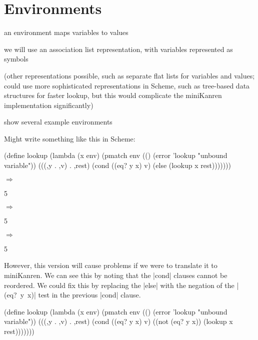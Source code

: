 \chapter{Environments}

an environment maps variables to values

we will use an association list representation, with variables represented as symbols

(other representations possible, such as separate flat lists for
variables and values; could use more sophisticated representations in
Scheme, such as tree-based data structures for faster lookup, but this
would complicate the miniKanren implementation significantly)

show several example environments

Might write something like this in Scheme:

\begin{schemedisplay}
(define lookup
  (lambda (x env)
    (pmatch env
      (() (error 'lookup "unbound variable"))
      (((,y . ,v) . ,rest)
       (cond
         ((eq? y x) v)
         (else (lookup x rest)))))))
\end{schemedisplay}


\noindent{} $\Rightarrow$
\begin{schemeresponsebox}5\end{schemeresponsebox}


\noindent{} $\Rightarrow$
\begin{schemeresponsebox}5\end{schemeresponsebox}


\noindent{} $\Rightarrow$
\begin{schemeresponsebox}5\end{schemeresponsebox}


However, this version will cause problems if we were to translate it
to miniKanren.  We can see this by noting that the \scheme|cond|
clauses cannot be reordered.  We could fix this by replacing the
\scheme|else| with the negation of the \mbox{\scheme|(eq? y x)|} test
in the previous \scheme|cond| clause.

\begin{schemedisplay}
(define lookup
  (lambda (x env)
    (pmatch env
      (() (error 'lookup "unbound variable"))
      (((,y . ,v) . ,rest)
       (cond
         ((eq? y x) v)
         ((not (eq? y x)) (lookup x rest)))))))
\end{schemedisplay}

